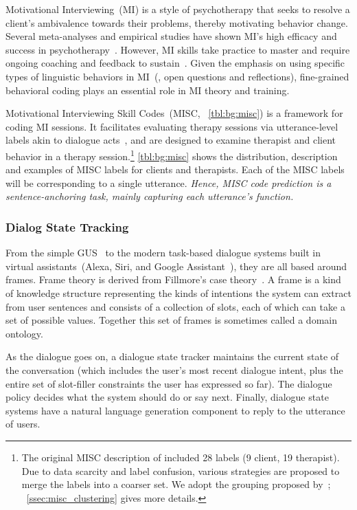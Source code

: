Motivational Interviewing~(MI) is a style of psychotherapy that seeks
to resolve a client's ambivalence towards their problems, thereby
motivating behavior change. Several meta-analyses and empirical
studies have shown MI's high efficacy and success in
psychotherapy~\citep{burke2004emerging, martins2009review,
  lundahl2010meta}. However, MI skills take practice to master and
require ongoing coaching and feedback to sustain~\citep{Schwalbe2014}.
Given the emphasis on using specific types of linguistic behaviors in
MI~(\eg, open questions and reflections), fine-grained behavioral
coding plays an essential role in MI theory and training.

Motivational Interviewing Skill Codes~(MISC, ~\autoref{tbl:bg:misc}) is a
framework for coding MI sessions. It facilitates evaluating therapy
sessions via utterance-level labels akin to dialogue
acts~\citep{stolcke2000dialogue,jurafsky2018speech}, and are designed
to examine therapist and client behavior in a therapy
session.\footnote{The original MISC description of
  \citet{miller2003manual} included 28 labels (9 client, 19
  therapist). Due to data scarcity and label confusion, various
  strategies are proposed to merge the labels into a coarser set.  We
  adopt the grouping proposed by~\citet{xiao2016behavioral}; ~\autoref{ssec:misc_clustering} gives more details.}
\autoref{tbl:bg:misc} shows the distribution, description and examples
of MISC labels for clients and therapists. Each of the MISC labels will
be corresponding to a single utterance. \textit{Hence, MISC code
prediction is a sentence-anchoring task, mainly capturing each utterance's function.}

\subsubsection{Dialog State Tracking}
\label{ssec:bg:dialogue-state}
From the simple GUS~\citep{bobrow1977gus} to the modern task-based
dialogue systems built in virtual assistants~(Alexa, Siri, and Google
Assistant~\etal), they are all based around frames. Frame theory is
derived from Fillmore's case theory~\citep{Fillmore:68}. A frame is a
kind of knowledge structure representing the kinds of intentions the
system can extract from user sentences and consists of a collection of
slots, each of which can take a set of possible values. Together this
set of frames is sometimes called a domain ontology.

As the dialogue goes on, a dialogue state tracker maintains the
current state of the conversation (which includes the user's most recent
dialogue intent, plus the entire set of slot-filler constraints the
user has expressed so far). The dialogue policy decides what the
system should do or say next. Finally, dialogue state systems have a
natural language generation component to reply to the utterance of users.

